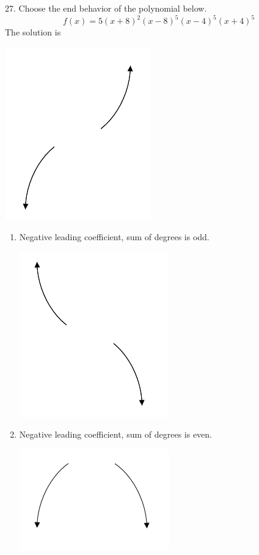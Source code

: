 \documentclass{article}[10pt]
\begin{document}
27. Choose the end behavior of the polynomial below.
$$ f(x) = 5(x + 8)^{2}(x - 8)^{5}(x - 4)^{5}(x + 4)^{5} $$ 
The solution is  
\begin{center}\includegraphics[scale=0.5]{../Figures/endBehaviorPositiveOdd.png}\end{center}\begin{enumerate}[label=\Alph*.] 
\item Negative leading coefficient, sum of degrees is odd. 
\begin{center}\includegraphics[scale=0.5]{../Figures/endBehaviorNegativeOdd.png}\end{center} 
 
\item Negative leading coefficient, sum of degrees is even. 
\begin{center}\includegraphics[scale=0.5]{../Figures/endBehaviorNegativeEven.png}\end{center} 
 

\end{enumerate}
\end{document}
